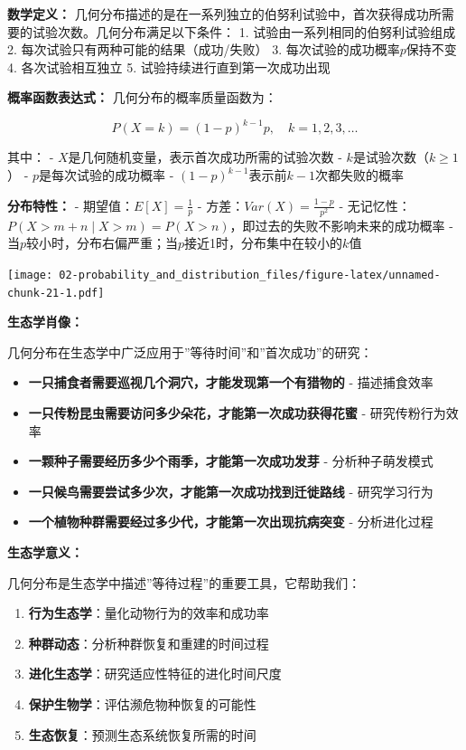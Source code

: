 \documentclass[
  twoside]{book}
\providecommand{\tightlist}{%
  \setlength{\itemsep}{0pt}\setlength{\parskip}{0pt}}
\begin{document}
\textbf{数学定义：} 几何分布描述的是在一系列独立的伯努利试验中，首次获得成功所需要的试验次数。几何分布满足以下条件：
1. 试验由一系列相同的伯努利试验组成
2. 每次试验只有两种可能的结果（成功/失败）
3. 每次试验的成功概率\(p\)保持不变
4. 各次试验相互独立
5. 试验持续进行直到第一次成功出现

\textbf{概率函数表达式：} 几何分布的概率质量函数为：

\[P(X = k) = (1-p)^{k-1} p, \quad k = 1, 2, 3, \ldots\]

其中：
- \(X\)是几何随机变量，表示首次成功所需的试验次数
- \(k\)是试验次数（\(k \geq 1\)）
- \(p\)是每次试验的成功概率
- \((1-p)^{k-1}\)表示前\(k-1\)次都失败的概率

\textbf{分布特性：}
- 期望值：\(E[X] = \frac{1}{p}\)
- 方差：\(Var(X) = \frac{1-p}{p^2}\)
- 无记忆性：\(P(X > m+n \mid X > m) = P(X > n)\)，即过去的失败不影响未来的成功概率
- 当\(p\)较小时，分布右偏严重；当\(p\)接近1时，分布集中在较小的\(k\)值

\texttt{[image: 02-probability\_and\_distribution\_files/figure-latex/unnamed-chunk-21-1.pdf]}

\textbf{生态学肖像：}

几何分布在生态学中广泛应用于''等待时间''和''首次成功''的研究：

\begin{itemize}
\tightlist
\item
  \textbf{一只捕食者需要巡视几个洞穴，才能发现第一个有猎物的} - 描述捕食效率
\item
  \textbf{一只传粉昆虫需要访问多少朵花，才能第一次成功获得花蜜} - 研究传粉行为效率
\item
  \textbf{一颗种子需要经历多少个雨季，才能第一次成功发芽} - 分析种子萌发模式
\item
  \textbf{一只候鸟需要尝试多少次，才能第一次成功找到迁徙路线} - 研究学习行为
\item
  \textbf{一个植物种群需要经过多少代，才能第一次出现抗病突变} - 分析进化过程
\end{itemize}

\textbf{生态学意义：}

几何分布是生态学中描述''等待过程''的重要工具，它帮助我们：

\begin{enumerate}
\def\labelenumi{\arabic{enumi}.}
\tightlist
\item
  \textbf{行为生态学}：量化动物行为的效率和成功率
\item
  \textbf{种群动态}：分析种群恢复和重建的时间过程
\item
  \textbf{进化生态学}：研究适应性特征的进化时间尺度
\item
  \textbf{保护生物学}：评估濒危物种恢复的可能性
\item
  \textbf{生态恢复}：预测生态系统恢复所需的时间
\end{enumerate}
\end{document}
